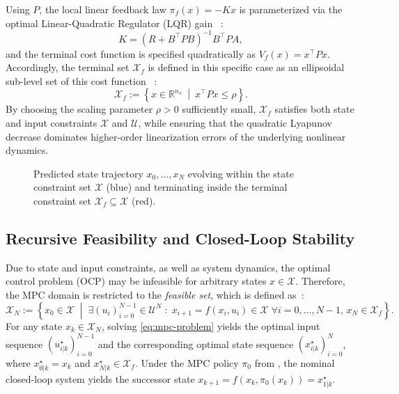 Using $P$, the local linear feedback law $\pi_f(x) = -K x$ is parameterized via the optimal Linear-Quadratic Regulator (LQR) gain~
:
\begin{equation}
    \label{eq:lqr-feedback}
    K = \left(R + B^\top P B\right)^{-1} B^\top P A,
\end{equation}
and the terminal cost function is specified quadratically as $V_f(x) = x^\top P x$.
Accordingly, the terminal set $\mathcal{X}_f$ is defined in this specific case 
as an ellipsoidal sub-level set of this cost function~
:
\begin{equation}
    \label{eq:terminal-ellipse}
    \mathcal{X}_f := \left\{ x \in \mathbb{R}^{n_x} \ \middle|\ x^\top P x \leq \rho \right\}.
\end{equation}
By choosing the scaling parameter $\rho > 0$ sufficiently small, $\mathcal{X}_f$ 
satisfies both state and input constraints $\mathcal{X}$ and $\mathcal{U}$, 
while ensuring that the quadratic Lyapunov decrease dominates higher-order 
linearization errors of the underlying nonlinear dynamics.

\begin{figure}[htbp]
    \centering
    
    \caption[Terminal set and predicted trajectory]{
        Predicted state trajectory $x_0, \dots, x_N$ evolving within the state constraint set $\mathcal{X}$ (blue) and 
        terminating inside the terminal constraint set $\mathcal{X}_f \subseteq \mathcal{X}$ (red).
    }
    \label{fig:terminal-set-comparison}
\end{figure}


\subsection{Recursive Feasibility and Closed-Loop Stability}
\label{subsec:closed-loop-stability}

Due to state and input constraints, as well as system dynamics, the optimal control problem (OCP) may be infeasible 
for arbitrary states $x \in \mathcal{X}$. 
Therefore, the MPC domain is restricted to the \emph{feasible set}, which is defined as~:
\begin{equation}
    \label{eq:feasible-set-compact}
    \mathcal{X}_N := \left\{ 
        x_0 \in \mathcal{X} \;\middle|\; \exists (u_i)_{i=0}^{N-1} \in \mathcal{U}^N 
            \; : \; x_{i+1} = f(x_i, u_i) \in \mathcal{X} \; \forall i = 0, \dots, N-1, \, x_N \in \mathcal{X}_f
    \right\}.
\end{equation}
For any state $x_k \in \mathcal{X}_N$, solving \eqref{eq:mpc-problem} yields the optimal input sequence 
$(u_{i|k}^\star)_{i=0}^{N-1}$ and the corresponding optimal state sequence $(x_{i|k}^\star)_{i=0}^{N}$, 
where $x_{0|k}^\star = x_k$ and $x_{N|k}^\star \in \mathcal{X}_f$. 
Under the MPC policy $\pi_0$ from , 
the nominal closed-loop system yields the successor state $x_{k+1} = f(x_k, \pi_0(x_k)) = x_{1|k}^\star$.

